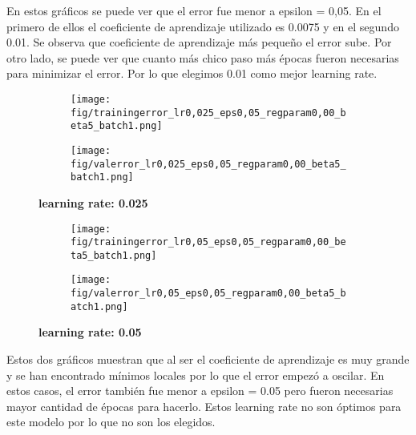 En estos gráficos se puede ver que el error fue menor a epsilon = 0,05.
 En el primero de ellos el coeficiente de aprendizaje utilizado es 
 0.0075 y en el segundo 0.01. Se observa que coeficiente de aprendizaje
  más pequeño el error sube. Por otro lado, se puede ver que cuanto 
  más chico paso más épocas fueron necesarias para minimizar el error. 
Por lo que elegimos 0.01 como mejor learning rate.

\newpage

\begin{figure}[h]	
	\begin{subfigure}[b]{0.5\textwidth}
		\texttt{[image: fig/trainingerror\_lr0,025\_eps0,05\_regparam0,00\_beta5\_batch1.png]}
	\end{subfigure}
	\begin{subfigure}[b]{0.5\textwidth}
		\texttt{[image: fig/valerror\_lr0,025\_eps0,05\_regparam0,00\_beta5\_batch1.png]}
	\end{subfigure}

	\caption{\textbf{learning rate: 0.025}}
\end{figure}



\begin{figure}[h]	
	\begin{subfigure}[b]{0.5\textwidth}
		\texttt{[image: fig/trainingerror\_lr0,05\_eps0,05\_regparam0,00\_beta5\_batch1.png]}
	\end{subfigure}
	\begin{subfigure}[b]{0.5\textwidth}
		\texttt{[image: fig/valerror\_lr0,05\_eps0,05\_regparam0,00\_beta5\_batch1.png]}
	\end{subfigure}

	\caption{\textbf{learning rate: 0.05}}
\end{figure}

Estos dos gráficos muestran que al ser el coeficiente de aprendizaje es
 muy grande y se han encontrado mínimos locales por lo que el error empezó
  a oscilar. En estos casos, el error también fue menor a epsilon = 0.05 
  pero fueron necesarias mayor cantidad de épocas para hacerlo. Estos 
  learning rate no son óptimos para este modelo por lo que no son 
  los elegidos.
\newpage
